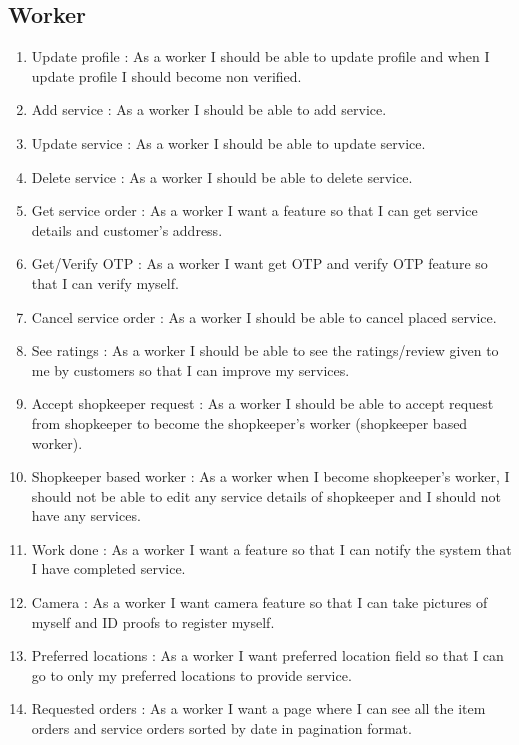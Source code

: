 \documentclass[conference]{IEEEtran}
\begin{document}
\subsection{Worker}
\begin{enumerate}
    \item Update profile : As a worker I should be able to update profile and when I update profile I should become non verified.
    \item Add service : As a worker I should be able to add service.
    \item Update service : As a worker I should be able to update service.
    \item Delete service : As a worker I should be able to delete service.
    \item Get service order : As a worker I want a feature so that I can get service details and customer’s address.
    \item Get/Verify OTP : As a worker I want get OTP and verify OTP feature so that I can verify myself.
    \item Cancel service order : As a worker I should be able to cancel placed service.
    \item See ratings : As a worker I should be able to see the ratings/review given to me by customers so that I can improve my services.
    \item Accept shopkeeper request : As a worker I should be able to accept request from shopkeeper to become the shopkeeper’s worker (shopkeeper based worker).
    \item Shopkeeper based worker : As a worker when I become shopkeeper’s worker, I should not be able to edit any service details of shopkeeper and I should not have any services.
    \item Work done : As a worker I want a feature so that I can notify the system that I have completed service.
    \item Camera : As a worker I want camera feature so that I can take pictures of myself and ID proofs to register myself.
    \item Preferred locations : As a worker I want preferred location field so that I can go to only my preferred locations to provide service.
    \item Requested orders : As a worker I want a page where I can see all the item orders and service orders sorted by date in pagination format.
\end{enumerate}
    
\end{document}
